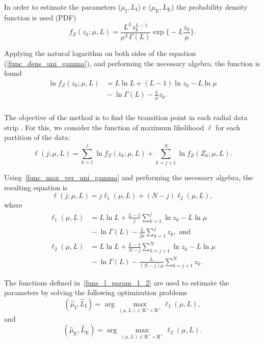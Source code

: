 \documentclass[journal]{IEEEtran}
\begin{document}
In order to estimate the parameters ($\mu_\text{I},L_\text{I}$) e ($\mu_\text{E},L_\text{E}$)  the probability density function is used (PDF)
\begin{equation}\label{func_dens_uni_gamma}
	f_Z(z_k;\mu,L)=\frac{L^{L}z_k^{L-1}}{\mu^{L}\Gamma(L)} \exp\Big\{-L\frac{z_k}{\mu}\Big\}.
\end{equation}

Applying the natural logarithm on both sides of the equation (\ref{func_dens_uni_gamma}), and performing  the necessary algebra,  the function is found
\begin{equation}\label{func_max_ver_uni_gamma}
\begin{split}
	\ln f_Z(z_k;\mu,L)&= L\ln L +(L - 1) \ln z_k-L \ln \mu \\
	 	                  &{}- \ln \Gamma(L) -\frac{L}{\mu} z_k.\\
\end{split}
\end{equation}

The objective of the method is to find the transition point in each radial data strip .
For this, we consider the function of maximum likelihood $\ell$ for each partition of the data:
\begin{equation}\nonumber
\ell(j;\mu, L)=\sum_{k=1}^{j}\ln f_{Z}(z_k;\mu,L)
             +\sum_{k=j+1}^{N}\ln f_{Z}(Z_k;\mu,L).
\end{equation}
 
Using~\eqref{func_max_ver_uni_gamma} and performing the necessary algebra, the resulting equation is 
\begin{equation}\label{func_l_param}
  \ell(j;\mu, L)=j\ell_1(\mu, L) + (N - j)\ell_2(\mu, L),
 \end{equation}
where
\begin{equation}\label{func_l_param_1_2}
\begin{split}
    \ell_1(\mu, L)&=L\ln L+\frac{L-1}{j}\sum_{k=1}^{j}\ln z_k-L\ln\mu\\
    &{}-\ln\Gamma(L) -\frac{L}{j\mu}\sum_{k=1}^{j} z_k,\text{ and}\\
    \ell_2(\mu, L)&=L\ln L+\frac{L-1}{N-j}\sum_{k=j+1}^{N}\ln z_k-L\ln\mu\\
    &{}-\ln\Gamma(L) -\frac{L}{(N-j)\mu}\sum_{k=j+1}^{N} z_k.
 \end{split}
\end{equation}
 
The functions defined in~\eqref{func_l_param_1_2} are used to estimate the parameters by solving the following optimization problems 
\begin{equation}\label{optimiz_l_1}
(\widehat{\mu}_\text{I},\widehat{L}_\text{I})= \arg\max\limits_{(\mu,L)\in \mathrm{R}^{+}\times\mathrm{R}^{+}}\ell_1(\mu,L),
\end{equation}
and
\begin{equation}\label{optimiz_l_2}
(\widehat{\mu}_\text{E},\widehat{L}_\text{E})= \arg\max\limits_{(\mu,L)\in \mathrm{R}^{+}\times\mathrm{R}^{+}}\ell_2(\mu,L).
\end{equation} 
\end{document}
